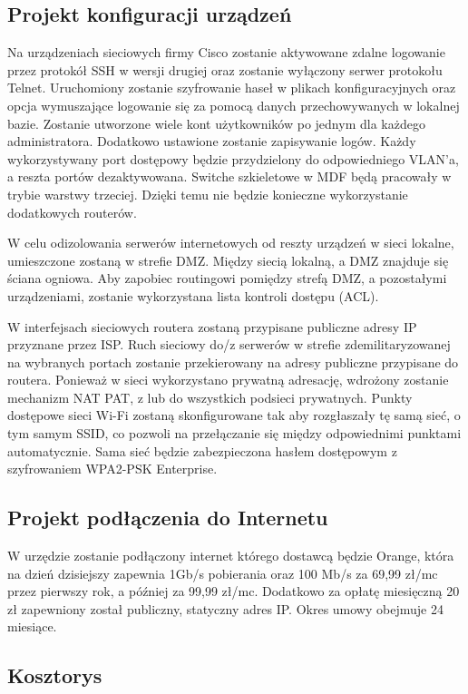 \documentclass[12pt,a4paper]{article}
\begin{document}
	\subsection{Projekt konfiguracji urządzeń}
	
	Na urządzeniach sieciowych firmy Cisco zostanie
	aktywowane zdalne logowanie przez protokół SSH w wersji drugiej oraz zostanie wyłączony
	serwer protokołu Telnet. Uruchomiony zostanie  szyfrowanie haseł w plikach
	konfiguracyjnych oraz  opcja wymuszające logowanie się za
	pomocą danych przechowywanych w lokalnej bazie. Zostanie utworzone
	wiele kont użytkowników po jednym dla każdego administratora. Dodatkowo ustawione zostanie zapisywanie logów.
	Każdy wykorzystywany port dostępowy będzie przydzielony do
	odpowiedniego VLAN’a, a reszta portów dezaktywowana.
	Switche szkieletowe w MDF będą pracowały w trybie warstwy trzeciej. Dzięki
	temu nie będzie konieczne wykorzystanie dodatkowych routerów.
	
	W celu odizolowania serwerów internetowych od reszty urządzeń w sieci lokalne, umieszczone zostaną w strefie DMZ. Między siecią lokalną, a DMZ znajduje się ściana ogniowa. Aby zapobiec routingowi pomiędzy strefą
	DMZ, a pozostałymi urządzeniami, zostanie wykorzystana lista kontroli dostępu (ACL).

	W interfejsach sieciowych routera zostaną przypisane publiczne adresy IP przyznane przez
    ISP. Ruch sieciowy do/z serwerów w strefie zdemilitaryzowanej na wybranych portach zostanie przekierowany na adresy publiczne przypisane do
	routera. Ponieważ w sieci wykorzystano prywatną adresację, wdrożony zostanie mechanizm
	NAT PAT, z lub do wszystkich podsieci prywatnych.
	Punkty dostępowe sieci Wi-Fi zostaną skonfigurowane tak aby rozgłaszały tę samą sieć, o tym
	samym SSID, co pozwoli na przełączanie się między odpowiednimi punktami automatycznie.
	Sama sieć będzie zabezpieczona hasłem dostępowym z szyfrowaniem WPA2-PSK Enterprise.
	
	
	\subsection{Projekt podłączenia do Internetu}
	W urzędzie zostanie podłączony internet którego dostawcą będzie Orange, która na dzień dzisiejszy
	zapewnia 1Gb/s pobierania oraz 100 Mb/s za 69,99 zł/mc przez pierwszy rok, a później za 99,99 zł/mc. Dodatkowo za opłatę miesięczną 20 zł zapewniony został publiczny, statyczny adres IP. Okres umowy obejmuje 24 miesiące.
	
	\subsection{Kosztorys}
	
\end{document}

